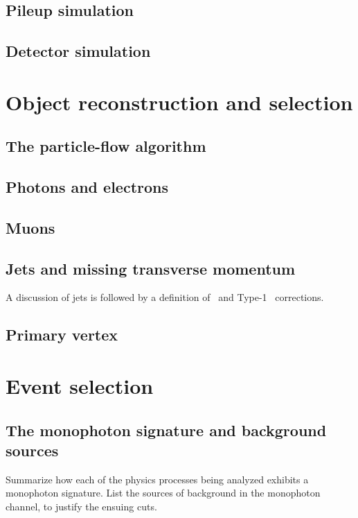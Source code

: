 \documentclass[oneside, letterpaper, 12pt, oldfontcommands]{memoir}
\begin{document}
\section{Pileup simulation} \label{sec:simulation_pileup}
\section{Detector simulation} \label{sec:simulation_detector}

\chapter{Object reconstruction and selection} \label{chap:reconstruction}
\section{The particle-flow algorithm} \label{sec:reconstruction_particle_flow}
\section{Photons and electrons} \label{sec:reconstruction_egamma}
\section{Muons} \label{sec:reconstruction_muons}
\section{Jets and missing transverse momentum} \label{sec:reconstruction_jetmet}
A discussion of jets is followed by a definition of \MET\ and Type-1 \MET\ corrections.
\section{Primary vertex} \label{sec:reconstruction_pv}

\chapter{Event selection} \label{chap:event_selection}
\section{The monophoton signature and background sources} \label{sec:event_selection_backgrounds}
Summarize how each of the physics processes being analyzed exhibits a monophoton signature.
List the sources of background in the monophoton channel, to justify the ensuing cuts.
\end{document}
